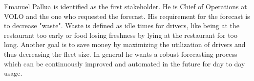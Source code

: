 \begin{table}[h]
\centering
\caption{SIPOC Diagram derived from the five basic steps}
\label{tab:sipoc}
\end{table}
Emanuel Pallua is identified as the first stakeholder. He is Chief of Operations at VOLO and the one who requested the forecast. His requirement for the forecast is to decrease "waste". Waste is defined as idle times for drivers, like being at the restaurant too early or food losing freshness by lying at the restaurant for too long. Another goal is to save money by maximizing the utilization of drivers and thus decreasing the fleet size. In general he wants a robust forecasting process which can be continuously improved and automated in the future for day to day usage. \newline
